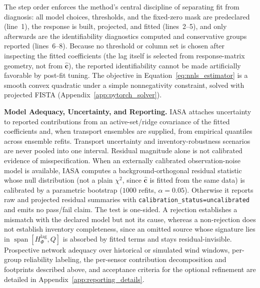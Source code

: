 The step order enforces the method's central discipline of separating fit from
diagnosis: all model choices, thresholds, and the fixed-zero mask are predeclared
(line~1), the response is built, projected, and fitted (lines~2--5), and only
afterwards are the identifiability diagnostics computed and conservative groups
reported (lines~6--8).  Because no threshold or column set is chosen after
inspecting the fitted coefficients (the lag itself is selected from response-matrix
geometry, not from \(\widehat{\mathbf c}\)), the reported identifiability cannot be
made artificially favorable by post-fit tuning.  The objective in
Equation~\ref{eq:nnls_estimator} is a smooth convex quadratic under a simple
nonnegativity constraint, solved with projected FISTA \citep{beck2009fast}
(Appendix~\ref{app:pytorch_solver}).

\noindent\textbf{Model Adequacy, Uncertainty, and Reporting.}
IASA attaches uncertainty to reported contributions from an active-set/ridge
covariance of the fitted coefficients and, when transport ensembles are supplied,
from empirical quantiles across ensemble refits.  Transport uncertainty and
inventory-robustness scenarios are never pooled into one interval.  Residual
magnitude alone is not calibrated evidence of misspecification.  When an externally
calibrated observation-noise model is available, IASA computes a
background-orthogonal residual statistic whose null distribution (not a plain
\(\chi^2\), since \(\widehat{\mathbf c}\) is fitted from the same data) is
calibrated by a parametric bootstrap (\(1000\) refits, \(\alpha=0.05\)).  Otherwise
it reports raw and projected residual summaries with
\texttt{calibration\_status=uncalibrated} and emits no pass/fail claim.  The test
is one-sided.  A rejection establishes a mismatch with the declared model but not
its cause, whereas a non-rejection does not establish inventory completeness, since
an omitted source whose signature lies in
\(\operatorname{span}[H_\Phi^{\mathrm{lag}},Q]\) is absorbed by fitted terms and
stays residual-invisible.  Prospective network adequacy over historical or
simulated wind windows, per-group reliability labeling, the per-sensor
contribution decomposition and footprints described above, and acceptance criteria for the
optional refinement are detailed in Appendix~\ref{app:reporting_details}.
